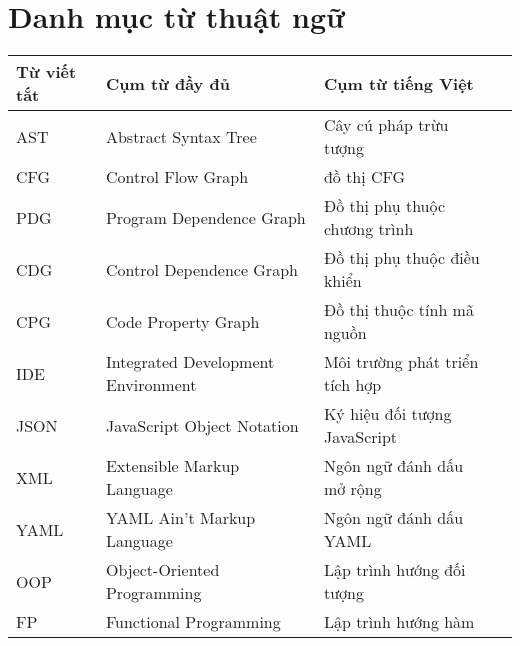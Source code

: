 \chapter*{Danh mục từ thuật ngữ}


\begin{table}[h]
\begin{tabularx}{\textwidth}{|l|l|X|X|}
\hline
\textbf{Từ viết tắt} & \textbf{Cụm từ đầy đủ} & \textbf{Cụm từ tiếng Việt} \\
\hline
AST & Abstract Syntax Tree & Cây cú pháp trừu tượng \\
\hline
CFG & Control Flow Graph & đồ thị CFG \\
\hline
PDG & Program Dependence Graph & Đồ thị phụ thuộc chương trình \\
\hline
CDG & Control Dependence Graph & Đồ thị phụ thuộc điều khiển \\
\hline
CPG & Code Property Graph & Đồ thị thuộc tính mã nguồn \\
\hline
IDE & Integrated Development Environment & Môi trường phát triển tích hợp \\
\hline
JSON & JavaScript Object Notation & Ký hiệu đối tượng JavaScript \\
\hline
XML & Extensible Markup Language & Ngôn ngữ đánh dấu mở rộng \\
\hline
YAML & YAML Ain't Markup Language & Ngôn ngữ đánh dấu YAML \\
\hline
OOP & Object-Oriented Programming & Lập trình hướng đối tượng \\
\hline
FP & Functional Programming & Lập trình hướng hàm \\
\hline
\end{tabularx}
\end{table}